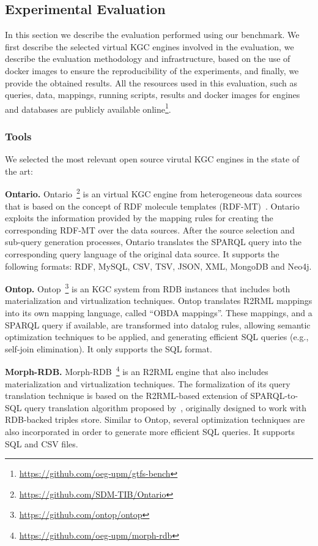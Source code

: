 \subsection{Experimental Evaluation}
In this section we describe the evaluation performed using our benchmark. We first describe the selected virtual KGC engines involved in the evaluation, we describe the evaluation methodology and infrastructure, based on the use of docker images to ensure the reproducibility of the experiments, and finally, we provide the obtained results. All the resources used in this evaluation, such as queries, data, mappings, running scripts, results and docker images for engines and databases are publicly available online\footnote{\url{https://github.com/oeg-upm/gtfs-bench}}.

\subsubsection{Tools}

We selected the most relevant open source virutal KGC engines in the state of the art: 

\noindent\textbf{Ontario.} Ontario~\citep{endris2019ontario}\footnote{\url{https://github.com/SDM-TIB/Ontario}} is an virtual KGC engine from heterogeneous data sources that is based on the concept of RDF molecule templates (RDF-MT)~\citep{endris2017mulder}. Ontario exploits the information provided by the mapping rules for creating the corresponding RDF-MT over the data sources. After the source selection and sub-query generation processes, Ontario translates the SPARQL query into the corresponding query language of the original data source. It supports the following formats: RDF, MySQL, CSV, TSV, JSON, XML, MongoDB and Neo4j.

\noindent\textbf{Ontop.} Ontop~\citep{rodriguez2015efficient}\footnote{\url{https://github.com/ontop/ontop}} is an KGC system from RDB instances that includes both materialization and virtualization techniques. Ontop translates R2RML mappings into its own mapping language, called ``OBDA mappings''. These mappings, and a SPARQL query if available, are transformed into datalog rules, allowing semantic optimization techniques to be applied, and generating efficient SQL queries (e.g., self-join elimination). It only supports the SQL format.

\noindent\textbf{Morph-RDB.} Morph-RDB~\citep{priyatna2014formalisation}\footnote{\url{https://github.com/oeg-upm/morph-rdb}} is an R2RML engine that also includes materialization and virtualization techniques. The formalization of its query translation technique is based on the R2RML-based extension of SPARQL-to-SQL query translation algorithm proposed by~\citep{chebotko2009semantics}, originally designed to work with RDB-backed triples store. Similar to Ontop, several optimization techniques are also incorporated in order to generate more efficient SQL queries. It supports SQL and CSV files.

